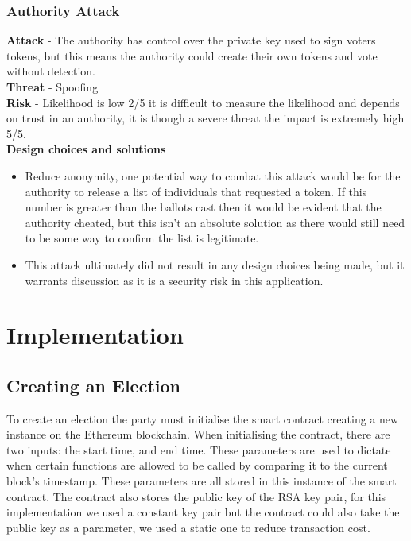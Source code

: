 \documentclass{entcs}
\begin{document}
\subsubsection{Authority Attack} \label{sec: Authority Attack}
\textbf{Attack} - The authority has control over the private key used to sign voters tokens, but this means the authority could create their own tokens and vote without detection. \\
\textbf{Threat} - Spoofing \\
\textbf{Risk} - Likelihood is low 2/5 it is difficult to measure the likelihood and depends on trust in an authority, it is though a severe threat the impact is extremely high 5/5.\\
\textbf{Design choices and solutions}
\begin{itemize}
    \item Reduce anonymity, one potential way to combat this attack would be for the authority to release a list of individuals that requested a token. If this number is greater than the ballots cast then it would be evident that the authority cheated, but this isn't an absolute solution as there would still need to be some way to confirm the list is legitimate.
    \item This attack ultimately did not result in any design choices being made, but it warrants discussion as it is a security risk in this application.
\end{itemize}


\section{Implementation} \label{sec: implementation}

\subsection{Creating an Election}

To create an election the party must initialise the smart contract creating a new instance on the Ethereum blockchain. When initialising the contract, there are two inputs: the start time, and end time. These parameters are used to dictate when certain functions are allowed to be called by comparing it to the current block's timestamp. These parameters are all stored in this instance of the smart contract. The contract also stores the public key of the RSA key pair, for this implementation we used a constant key pair but the contract could also take the public key as a parameter, we used a static one to reduce transaction cost.
\end{document}
